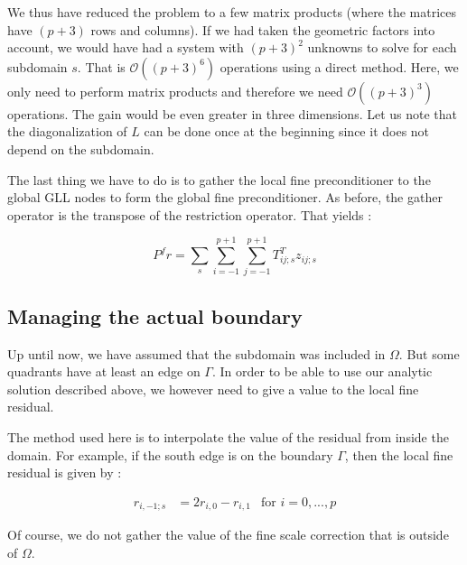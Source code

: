 We thus have reduced the problem to a few matrix products (where the matrices have $(p+3)$ rows and columns). If we had taken the geometric factors into account, we would have had a system with $(p+3)^2$ unknowns to solve for each subdomain $s$. That is $\mathcal{O}((p+3)^6)$ operations using a direct method. Here, we only need to perform matrix products and therefore we need $\mathcal{O}((p+3)^3)$ operations. The gain would be even greater in three dimensions. Let us note that the diagonalization of $L$ can be done once at the beginning since it does not depend on the subdomain.

The last thing we have to do is to gather the local fine preconditioner to the global GLL nodes to form the global fine preconditioner. As before, the gather operator is the transpose of the restriction operator. That yields : 

$$ P^f r = \sum_s \sum_{i=-1}^{p+1}\sum_{j=-1}^{p+1} T^T_{ij;s} z_{ij;s}$$

\subsection{Managing the actual boundary}

Up until now, we have assumed that the subdomain was included in $\Omega$. But some quadrants have at least an edge on $\Gamma$. In order to be able to use our analytic solution described above, we however need to give a value to the local fine residual. 

The method used here is to interpolate the value of the residual from inside the domain. For example, if the south edge is on the boundary $\Gamma$, then the local fine residual is given by : 

\begin{align*}
r_{i,-1;s} &= 2r_{i,0} - r_{i,1} &\text{for $i=0,...,p$}
\end{align*}

Of course, we do not gather the value of the fine scale correction that is outside of $\Omega$.









